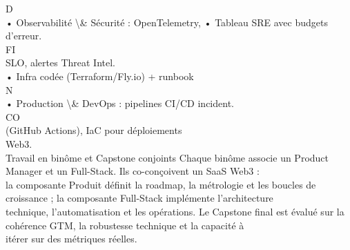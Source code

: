 \documentclass[12pt,landscape,a4paper]{article}
\begin{document}
\vspace{0.5em}
\vspace{0.5em}
D\\
• Observabilité \textbackslash{}& Sécurité : OpenTelemetry, • Tableau SRE avec budgets d’erreur.\\
\vspace{0.5em}
\vspace{0.5em}
\vspace{0.5em}
\vspace{0.5em}
FI\\
SLO, alertes Threat Intel.\\
• Infra codée (Terraform/Fly.io) + runbook\\
\vspace{0.5em}
N\\
• Production \textbackslash{}& DevOps : pipelines CI/CD       incident.\\
CO\\
(GitHub Actions), IaC pour déploiements\\
Web3.\\
\vspace{0.5em}
\vspace{0.5em}
Travail en binôme et Capstone conjoints Chaque binôme associe un Product Manager et un Full-Stack. Ils co-conçoivent un SaaS Web3 :\\
la composante Produit définit la roadmap, la métrologie et les boucles de croissance ; la composante Full-Stack implémente l’architecture\\
technique, l’automatisation et les opérations. Le Capstone final est évalué sur la cohérence GTM, la robustesse technique et la capacité à\\
itérer sur des métriques réelles.\\
\vspace{0.5em}
\vspace{0.5em}
\end{document}
